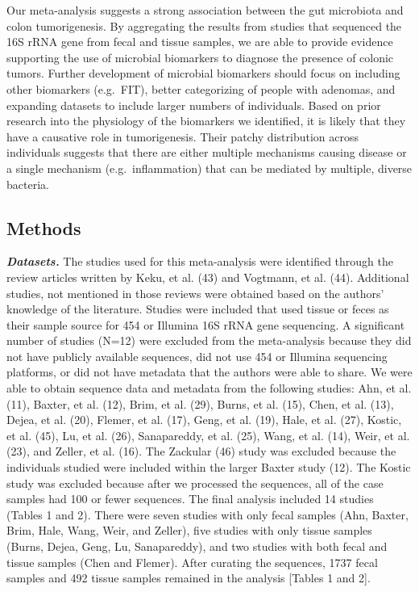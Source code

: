 \documentclass[12pt,]{article}
\begin{document}
Our meta-analysis suggests a strong association between the gut
microbiota and colon tumorigenesis. By aggregating the results from
studies that sequenced the 16S rRNA gene from fecal and tissue samples,
we are able to provide evidence supporting the use of microbial
biomarkers to diagnose the presence of colonic tumors. Further
development of microbial biomarkers should focus on including other
biomarkers (e.g.~FIT), better categorizing of people with adenomas, and
expanding datasets to include larger numbers of individuals. Based on
prior research into the physiology of the biomarkers we identified, it
is likely that they have a causative role in tumorigenesis. Their patchy
distribution across individuals suggests that there are either multiple
mechanisms causing disease or a single mechanism (e.g.~inflammation)
that can be mediated by multiple, diverse bacteria.

\newpage

\subsection{Methods}\label{methods}

\textbf{\emph{Datasets.}} The studies used for this meta-analysis were
identified through the review articles written by Keku, et al. (43) and
Vogtmann, et al. (44). Additional studies, not mentioned in those
reviews were obtained based on the authors' knowledge of the literature.
Studies were included that used tissue or feces as their sample source
for 454 or Illumina 16S rRNA gene sequencing. A significant number of
studies (N=12) were excluded from the meta-analysis because they did not
have publicly available sequences, did not use 454 or Illumina
sequencing platforms, or did not have metadata that the authors were
able to share. We were able to obtain sequence data and metadata from
the following studies: Ahn, et al. (11), Baxter, et al. (12), Brim, et
al. (29), Burns, et al. (15), Chen, et al. (13), Dejea, et al. (20),
Flemer, et al. (17), Geng, et al. (19), Hale, et al. (27), Kostic, et
al. (45), Lu, et al. (26), Sanapareddy, et al. (25), Wang, et al. (14),
Weir, et al. (23), and Zeller, et al. (16). The Zackular (46) study was
excluded because the individuals studied were included within the larger
Baxter study (12). The Kostic study was excluded because after we
processed the sequences, all of the case samples had 100 or fewer
sequences. The final analysis included 14 studies (Tables 1 and 2).
There were seven studies with only fecal samples (Ahn, Baxter, Brim,
Hale, Wang, Weir, and Zeller), five studies with only tissue samples
(Burns, Dejea, Geng, Lu, Sanapareddy), and two studies with both fecal
and tissue samples (Chen and Flemer). After curating the sequences, 1737
fecal samples and 492 tissue samples remained in the analysis {[}Tables
1 and 2{]}.
\end{document}
